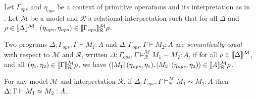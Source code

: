   Let $\Gamma_{\mathit{ops}}$ and $\eta_{\mathit{ops}}$ be a context
  of primitive operations and its interpretation as in
  . Let $\mathcal{M}$ be a model and $\mathcal{R}$  
  a relational interpretation such that for
  all $\Delta$ and $\rho \in \llbracket \Delta \rrbracket^{\mathcal{M}}$,
  $(\eta_{\mathit{ops}}, \eta_{\mathit{ops}}) \in
  \llbracket \Gamma_{\mathit{ops}} \rrbracket^{\mathcal{M}}_{\mathcal{R}} \rho$.
\newcommand{\semeq}[7]{{#3};\Gamma_{\mathit{ops}},{#4}\models^{\mathcal{#1}}_{\mathcal{#2}}{#5}\sim{#6}:{#7}}

\begin{definition}\label{def:semantic-equality}
  Two programs $\Delta; \Gamma_{\mathit{ops}}, \Gamma \vdash M_1 : A$
  and $\Delta; \Gamma_{\mathit{ops}}, \Gamma \vdash M_2 : A$ are
  \emph{semantically equal} with respect to $\mathcal{M}$ and $\mathcal{R}$,
  written $\semeq M R \Delta\Gamma{M_1}{M_2} A$, if for all $\rho \in
  \llbracket \Delta \rrbracket^{\mathcal{M}}$, and all $(\eta_1,\eta_2) \in
  \llbracket \Gamma \rrbracket^{\mathcal{M}}_{\mathcal{R}} \rho$, we have
  $(\left| M_1\right|(\eta_{\mathit{ops}},
  \eta_1),\left| M_2\right|(\eta_{\mathit{ops}}, \eta_2)) \in
  \llbracket A \rrbracket^{\mathcal{M}}_{\mathcal{R}}\rho$.
\end{definition}

\begin{theorem}[Soundness]\label{thm:soundness}
For any model $\mathcal{M}$ and interpretation $\mathcal{R}$, 
if $\semeq M R \Delta\Gamma {M_1}{M_2} A$ then
${\Delta};{\Gamma}\vdash{M_1}\approx{M_2}:{A}$.
\end{theorem}



